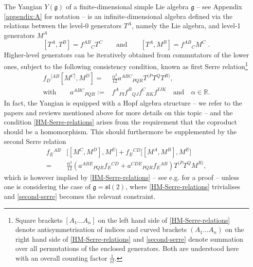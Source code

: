 \documentclass[12pt]{article}
\numberwithin{equation}{section}
\begin{document}
The Yangian $Y(\mathfrak{g})$ of a finite-dimensional simple Lie algebra $\mathfrak{g}$ -- see Appendix \ref{appendix:A} for notation -- is an infinite-dimensional algebra defined via the relations between the level-0 generators $T^{A}$, namely the Lie algebra, and level-1 generators $M^{A}$
\begin{equation}\label{HM-Yangian-general-level0-and-level1-brackets}
[T^{A},T^{B}]=f^{AB}{}_{C}T^{C} 
\qquad \text{and} \qquad 
[ T^{A},M^{B} ]=f^{AB}{}_{C}M^{C} \,\, .
\end{equation}
Higher-level generators can be iteratively obtained from commutators of the lower ones, subject to the following consistency condition, known as first Serre relation\footnote{\label{footnote:symmetrisation-of-indices}Square brackets $[A_{1}...A_{n}]$ on the left hand side of \eqref{HM-Serre-relations} denote antisymmetrisation of indices and curved brackets $(A_{1}...A_{n})$ on the right hand side of \eqref{HM-Serre-relations} and \eqref{second-serre}  denote summation over all permutations of the enclosed generators. Both are understood here with an overall counting factor $\tfrac{1}{n!}$.}
\begin{equation}\label{HM-Serre-relations}
\begin{aligned}
f_{D}{}^{[AB}[M^{C]},M^{D}]=&\tfrac{\alpha^2}{12}a^{ABC}{}_{PQR}T^{(P}T^{Q}T^{R)},  
\\
\text{with} \qquad a^{ABC}{}_{PQR}:=&f^{A}{}_{PI}f^{B}{}_{QJ}f^{C}{}_{RK}f^{IJK} 
\quad \text{and} \quad \alpha\in \mathbb{R}.
\end{aligned}
\end{equation}
In fact, the Yangian is equipped with a Hopf algebra structure -- we refer to the papers and reviews mentioned above for more details on this topic -- and the condition \eqref{HM-Serre-relations} arises from the requirement that the coproduct should be a homomorphism. This should furthermore be supplemented by the second Serre relation
\begin{equation}\label{second-serre}
\begin{aligned}
f_{E}{}^{AB}&\bigl[[M^{C},M^{D}],M^{E}\bigr]+f_{E}{}^{CD}\bigl[[M^{A},M^{B}],M^{E}\bigr]
\\
=&\tfrac{\alpha^2}{12}(a^{ABE}{}_{PQR}f_{E}{}^{CD}+a^{CDE}{}_{PQR}f_{E}{}^{AB})T^{(P}T^{Q}M^{R)} ,
\end{aligned}
\end{equation}
which is however implied by \eqref{HM-Serre-relations} -- see e.g. \cite{Itsios:2014vfa} for a proof -- unless one is considering the case of $\mathfrak{g}=\mathfrak{sl}(2)$, where \eqref{HM-Serre-relations} trivialises and \eqref{second-serre} becomes the relevant constraint.
\end{document}
